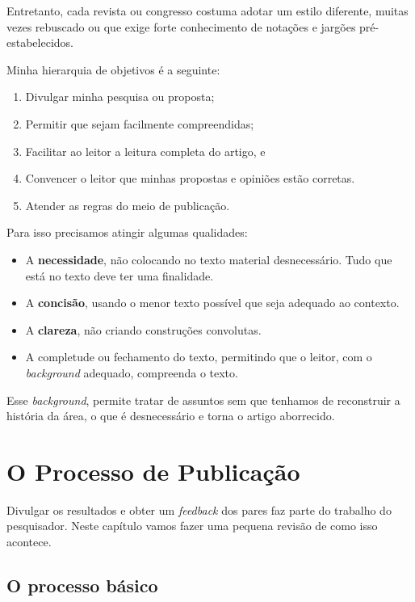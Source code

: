\documentclass[openany]{book}
\begin{document}
 Entretanto, cada revista ou congresso costuma adotar um estilo diferente, muitas vezes  rebuscado ou que exige forte conhecimento de notações e jargões pré-estabelecidos.

Minha hierarquia de objetivos é a seguinte:
\begin{enumerate}
    \item Divulgar minha pesquisa ou proposta;
    \item Permitir que sejam facilmente compreendidas;
    \item Facilitar ao leitor a leitura completa do artigo, e
    \item Convencer o leitor que minhas propostas e opiniões estão corretas.
    \item Atender as regras do meio de publicação.
\end{enumerate}

Para isso precisamos atingir algumas qualidades:
\begin{itemize}
    \item A \textbf{necessidade}, não colocando no texto material desnecessário. Tudo que está no texto deve ter uma finalidade.
    \item A \textbf{concisão}, usando o menor texto possível que seja adequado ao contexto.
    \item A \textbf{clareza}, não criando construções convolutas.
    \item A completude ou fechamento do texto, permitindo que o leitor, com o \textit{background} adequado, compreenda o texto.
\end{itemize}

 Esse \textit{background}, permite tratar de assuntos sem que tenhamos de reconstruir a história da área, o que é desnecessário e torna o artigo aborrecido.




\chapter{O Processo de Publicação}

 Divulgar os resultados e obter um \textit{feedback} dos pares faz parte do trabalho do pesquisador. Neste capítulo vamos fazer uma pequena revisão de como isso acontece.

\section{O processo básico}
\end{document}
